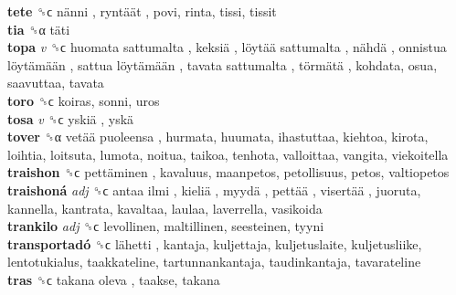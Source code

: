 \textbf{tete} ␝ϲ   nänni ,  ryntäät , povi, rinta, tissi, tissit  \\
\textbf{tia} ␝α   täti   \\
\textbf{topa} \emph{v}  ␝ϲ   huomata sattumalta ,  keksiä ,  löytää sattumalta ,  nähdä ,  onnistua löytämään ,  sattua löytämään ,  tavata sattumalta ,  törmätä , kohdata, osua, saavuttaa, tavata  \\
\textbf{toro} ␝ϲ  koiras, sonni, uros  \\
\textbf{tosa} \emph{v}  ␝ϲ   yskiä ,  yskä   \\
\textbf{tover} ␝α   vetää puoleensa , hurmata, huumata, ihastuttaa, kiehtoa, kirota, loihtia, loitsuta, lumota, noitua, taikoa, tenhota, valloittaa, vangita, viekoitella  \\
\textbf{traishon} ␝ϲ   pettäminen , kavaluus, maanpetos, petollisuus, petos, valtiopetos  \\
\textbf{traishoná} \emph{adj}  ␝ϲ   antaa ilmi ,  kieliä ,  myydä ,  pettää ,  visertää , juoruta, kannella, kantrata, kavaltaa, laulaa, laverrella, vasikoida  \\
\textbf{trankilo} \emph{adj}  ␝ϲ  levollinen, maltillinen, seesteinen, tyyni  \\
\textbf{transportadó} ␝ϲ   lähetti , kantaja, kuljettaja, kuljetuslaite, kuljetusliike, lentotukialus, taakkateline, tartunnankantaja, taudinkantaja, tavarateline  \\
\textbf{tras} ␝ϲ   takana oleva , taakse, takana  \\
